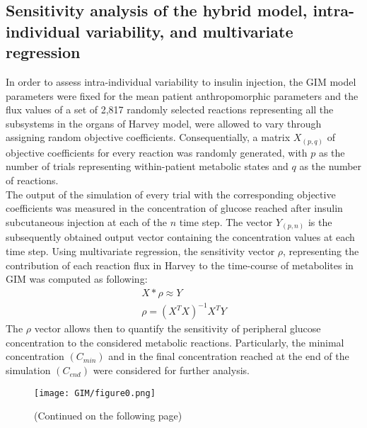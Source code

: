 \subsection{Sensitivity analysis of the hybrid model, intra-individual variability, and multivariate regression}
In order to assess intra-individual variability to insulin injection, the GIM model parameters were fixed for the mean patient anthropomorphic parameters \cite{schaller2013generic} and the flux values of a set of 2,817 randomly selected reactions representing all the subsystems in the organs of Harvey model, were allowed to vary through assigning random objective coefficients. Consequentially, a matrix $X_{(p,q)}$ of objective coefficients for every reaction was randomly generated, with $p$ as the number of trials representing within-patient metabolic states and $q$ as the number of reactions.\\
The output of the simulation of every trial with the corresponding objective coefficients was measured in the concentration of glucose reached after insulin subcutaneous injection at each of the $n$ time step.  
The vector $Y_{(p,n)}$ is the subsequently obtained output vector containing the concentration values at each time step. Using multivariate regression, the sensitivity vector $\rho$, representing the contribution of each reaction flux in Harvey to the time-course of metabolites in GIM was computed as following:
\begin{gather*}
X* \rho \approx Y \\
\rho=(X^{T}X)^{-1}X^{T}Y
\end{gather*}
The $\rho$ vector allows then to quantify the sensitivity of peripheral glucose concentration to the considered metabolic reactions. Particularly, the minimal concentration $(C_{min})$ and in the final concentration reached at the end of the simulation $(C_{end})$ were considered for further analysis.
\begin{figure}[!htp]
\centering
	\texttt{[image: GIM/figure0.png]}%
	\caption[Mapping of dynamical constraints from GIM to Harvey.]{(Continued on the following page)}
	\label{fig:GIM0}
\end{figure}
\begin{figure}[t]
\end{figure}
